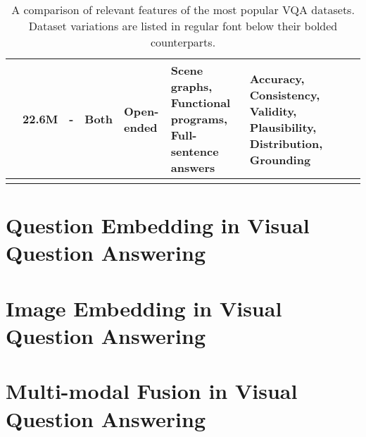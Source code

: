 \begin{center}
\begin{xltabular}{\textwidth}{LLLLLLLLL}
  & 22.6M  %
  & -
  & Both
  & Open-ended
  & Scene graphs, Functional programs, Full-sentence answers
  & Accuracy, Consistency, Validity, Plausibility, Distribution, Grounding \\
  \bottomrule
  \caption{A comparison of relevant features of the most popular VQA datasets. Dataset variations are listed in regular font below their bolded counterparts.}
  \label{tab:dataset_comparison}
\end{xltabular}
\end{center}



\section{Question Embedding in Visual Question Answering}

\section{Image Embedding in Visual Question Answering}

\section{Multi-modal Fusion in Visual Question Answering}